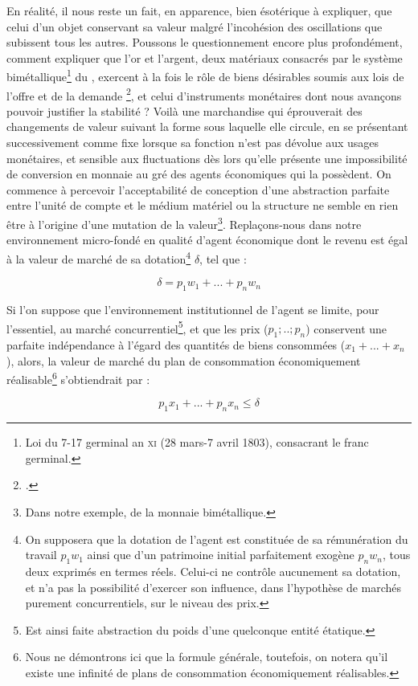 {En réalité, il nous reste un fait, en apparence, bien ésotérique à expliquer, que celui d'un objet conservant sa valeur malgré l'incohésion des oscillations que subissent tous les autres. Poussons le questionnement encore plus profondément, comment expliquer que l'or et l'argent, deux matériaux consacrés par le système bimétallique\footnote{Loi du 7-17 germinal an \textsc{xi} (28 mars-7 avril 1803), consacrant le franc germinal.} du , exercent à la fois le rôle de biens désirables soumis aux lois de l'offre et de la demande \footnote{.}, et celui d'instruments monétaires dont nous avançons pouvoir justifier  la stabilité ? Voilà une marchandise qui éprouverait des changements de valeur suivant la forme sous laquelle elle circule, en se présentant successivement comme fixe lorsque sa fonction n'est pas dévolue aux usages monétaires, et sensible aux fluctuations dès lors qu'elle présente une impossibilité de conversion en monnaie au gré des agents économiques qui la possèdent. On commence à percevoir l'acceptabilité de conception d'une abstraction parfaite entre l'unité de compte et le médium matériel ou la structure ne semble en rien être à l'origine d'une mutation de la valeur\footnote{Dans notre exemple, de la monnaie bimétallique.}. Replaçons-nous dans notre environnement micro-fondé en qualité d'agent économique dont le revenu est égal à la valeur de marché de sa dotation\footnote{On supposera que la dotation de l'agent est constituée de sa rémunération du travail \(p_1w_1\) ainsi que d'un patrimoine initial parfaitement exogène \(p_nw_n\), tous deux exprimés en termes réels. Celui-ci ne contrôle aucunement sa dotation, et n'a pas la possibilité d'exercer son influence, dans l'hypothèse de marchés purement concurrentiels, sur le niveau des prix.} $\delta$, tel que :
	
\[ \delta = p_1w_1 + ... + p_nw_n\]

Si l'on suppose que l'environnement institutionnel de l'agent se limite, pour l'essentiel, au marché concurrentiel\footnote{Est ainsi faite abstraction du poids d'une quelconque entité étatique.}, et que les prix (\(p_1;..;p_n\)) conservent une parfaite indépendance à l'égard des quantités de biens consommées (\(x_1 + ... + x_n\)), alors, la valeur de marché du plan de consommation économiquement réalisable\footnote{Nous ne démontrons ici que la formule générale, toutefois, on notera qu'il existe une infinité de plans de consommation économiquement réalisables.} s'obtiendrait par :

\[ p_1x_1 + ... + p_nx_n\leq  \delta \]
 
}
